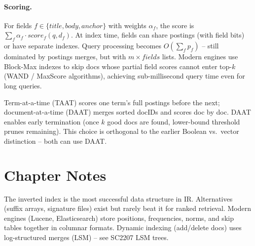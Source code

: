 \paragraph{Scoring.} For fields $f\in\{title,body,anchor\}$ with weights $\alpha_f$, the score is $\sum_f \alpha_f\cdot score_f(q,d_f)$. At index time, fields can share postings (with field bits) or have separate indexes. Query processing becomes $O(\sum_f p_f)$ -- still dominated by postings merges, but with $m\times fields$ lists. Modern engines use Block-Max indexes to skip docs whose partial field scores cannot enter top-$k$ (WAND / MaxScore algorithms), achieving sub-millisecond query time even for long queries.

\begin{remark}
Term-at-a-time (TAAT) scores one term's full postings before the next; document-at-a-time (DAAT) merges sorted docIDs and scores doc by doc. DAAT enables early termination (once $k$ good docs are found, lower-bound threshold prunes remaining). This choice is orthogonal to the earlier Boolean vs.\ vector distinction -- both can use DAAT.
\end{remark}

\section{Chapter Notes}
The inverted index is the most successful data structure in IR. Alternatives (suffix arrays, signature files) exist but rarely beat it for ranked retrieval. Modern engines (Lucene, Elasticsearch) store positions, frequencies, norms, and skip tables together in columnar formats. Dynamic indexing (add/delete docs) uses log-structured merges (LSM) -- see SC2207 LSM trees.

